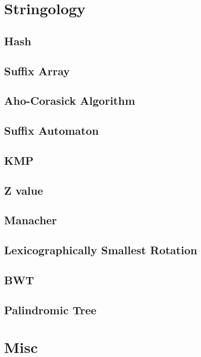 \documentclass[a4paper,10pt,twocolumn,oneside]{article}
\begin{document}
\section{Stringology}
\subsection{Hash}

\subsection{Suffix Array}

\subsection{Aho-Corasick Algorithm}

\subsection{Suffix Automaton}

\subsection{KMP}

\subsection{Z value}

\subsection{Manacher}

\subsection{Lexicographically Smallest Rotation}

\subsection{BWT}

\subsection{Palindromic Tree}


\section{Misc}
\end{document}
